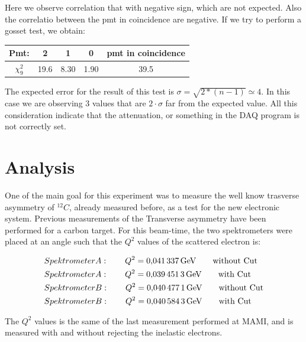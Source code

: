 Here we observe correlation that with negative sign, which are not expected. Also the correlatio between the pmt in coincidence are negative.
If we try to perform a gosset test, we obtain:

\begingroup
\setlength{\tabcolsep}{8pt} %
\renewcommand{\arraystretch}{1.2} %
\begin{center}
\begin{tabular}{|c|c|c|c|c|}
\hline 
Pmt: & 2 & 1 & 0 & pmt in coincidence \\ 
\hline
$\chi^{2}_{9}$ & 19.6 & 8.30 & 1.90 & 39.5\\ 
\hline
\end{tabular} 
\end{center}
\endgroup
\smallskip

The expected error for the result of this test is $\sigma = \sqrt{2*(n-1)} \simeq 4$. In this case we are observing 3 values that are $2\cdot \sigma $ far from the expected value. All this consideration indicate that the attenuation, or something in the DAQ program is not correctly set. 

\section{Analysis}

One of the main goal for this experiment was to measure the well know trasverse asymmetry of $^{12}C$, already measured before, as a test for the new electronic system. Previous measurements of the Transverse asymmetry have been performed for a carbon target. For this beam-time, the two spektrometers were placed at an angle such that the $Q^{2}$ values of the scattered electron is:

\begin{flushleft}
\begin{align*}
& Spektrometer A : \qquad Q^{2} = \SI{0.041337}{\giga \electronvolt} \qquad \textnormal{without Cut} \\
& Spektrometer A : \qquad Q^{2} = \SI{0.0394513}{\giga \electronvolt} \qquad \textnormal{with Cut} \\
& Spektrometer B : \qquad Q^{2} = \SI{0.0404771}{\giga \electronvolt} \qquad \textnormal{without Cut} \\
& Spektrometer B : \qquad Q^{2} = \SI{0.0405843}{\giga \electronvolt} \qquad \textnormal{with Cut} 
\end{align*} 
\end{flushleft}

The $Q^{2}$ values is the same of the last measurement performed at MAMI, and is measured with and without rejecting the inelastic electrons. 



